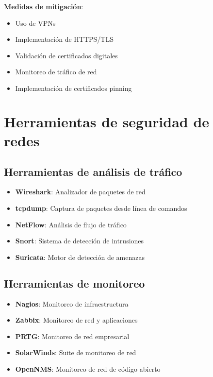 \textbf{Medidas de mitigación}:
\begin{itemize}
    \item Uso de VPNs
    \item Implementación de HTTPS/TLS
    \item Validación de certificados digitales
    \item Monitoreo de tráfico de red
    \item Implementación de certificados pinning
\end{itemize}

\section{Herramientas de seguridad de redes}

\subsection{Herramientas de análisis de tráfico}

\begin{itemize}
    \item \textbf{Wireshark}: Analizador de paquetes de red
    \item \textbf{tcpdump}: Captura de paquetes desde línea de comandos
    \item \textbf{NetFlow}: Análisis de flujo de tráfico
    \item \textbf{Snort}: Sistema de detección de intrusiones
    \item \textbf{Suricata}: Motor de detección de amenazas
\end{itemize}

\subsection{Herramientas de monitoreo}

\begin{itemize}
    \item \textbf{Nagios}: Monitoreo de infraestructura
    \item \textbf{Zabbix}: Monitoreo de red y aplicaciones
    \item \textbf{PRTG}: Monitoreo de red empresarial
    \item \textbf{SolarWinds}: Suite de monitoreo de red
    \item \textbf{OpenNMS}: Monitoreo de red de código abierto
\end{itemize}

